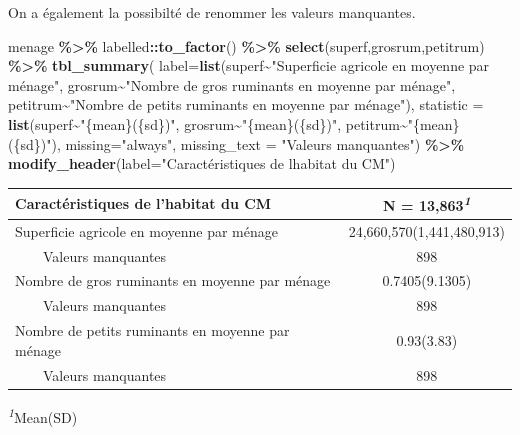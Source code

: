\documentclass[
]{article}
\newenvironment{Shaded}{\begin{snugshade}}{\end{snugshade}}
\newcommand{\AttributeTok}[1]{\textcolor[rgb]{0.13,0.29,0.53}{#1}}
\newcommand{\FunctionTok}[1]{\textcolor[rgb]{0.13,0.29,0.53}{\textbf{#1}}}
\newcommand{\NormalTok}[1]{#1}
\newcommand{\SpecialCharTok}[1]{\textcolor[rgb]{0.81,0.36,0.00}{\textbf{#1}}}
\newcommand{\StringTok}[1]{\textcolor[rgb]{0.31,0.60,0.02}{#1}}
\begin{document}
On a également la possibilté de renommer les valeurs manquantes.

\begin{Shaded}
\begin{Highlighting}[]
\NormalTok{menage }\SpecialCharTok{\%\textgreater{}\%}
\NormalTok{  labelled}\SpecialCharTok{::}\FunctionTok{to\_factor}\NormalTok{() }\SpecialCharTok{\%\textgreater{}\%}
  \FunctionTok{select}\NormalTok{(superf,grosrum,petitrum) }\SpecialCharTok{\%\textgreater{}\%}
  \FunctionTok{tbl\_summary}\NormalTok{(}
    \AttributeTok{label=}\FunctionTok{list}\NormalTok{(superf}\SpecialCharTok{\textasciitilde{}}\StringTok{"Superficie agricole en moyenne par ménage"}\NormalTok{,}
\NormalTok{               grosrum}\SpecialCharTok{\textasciitilde{}}\StringTok{"Nombre de gros ruminants en moyenne par ménage"}\NormalTok{,}
\NormalTok{               petitrum}\SpecialCharTok{\textasciitilde{}}\StringTok{"Nombre de petits ruminants en moyenne par ménage"}\NormalTok{),}
    \AttributeTok{statistic =} \FunctionTok{list}\NormalTok{(superf}\SpecialCharTok{\textasciitilde{}}\StringTok{"\{mean\}(\{sd\})"}\NormalTok{,}
\NormalTok{                     grosrum}\SpecialCharTok{\textasciitilde{}}\StringTok{"\{mean\}(\{sd\})"}\NormalTok{,}
\NormalTok{                     petitrum}\SpecialCharTok{\textasciitilde{}}\StringTok{"\{mean\}(\{sd\})"}\NormalTok{),}
    \AttributeTok{missing=}\StringTok{"always"}\NormalTok{,}
    \AttributeTok{missing\_text =} \StringTok{"Valeurs manquantes"}\NormalTok{) }\SpecialCharTok{\%\textgreater{}\%}
  \FunctionTok{modify\_header}\NormalTok{(}\AttributeTok{label=}\StringTok{"Caractéristiques de l\textquotesingle{}habitat du CM"}\NormalTok{)}
\end{Highlighting}
\end{Shaded}

\begin{table}[!t]
\fontsize{12.0pt}{14.4pt}\selectfont
\begin{tabular*}{\linewidth}{@{\extracolsep{\fill}}lc}
\toprule
Caractéristiques de l'habitat du CM & \textbf{N = 13,863}\textsuperscript{\textit{1}} \\ 
\midrule\addlinespace[2.5pt]
Superficie agricole en moyenne par ménage & 24,660,570(1,441,480,913) \\ 
    Valeurs manquantes & 898 \\ 
Nombre de gros ruminants en moyenne par ménage & 0.7405(9.1305) \\ 
    Valeurs manquantes & 898 \\ 
Nombre de petits ruminants en moyenne par ménage & 0.93(3.83) \\ 
    Valeurs manquantes & 898 \\ 
\bottomrule
\end{tabular*}
\begin{minipage}{\linewidth}
\textsuperscript{\textit{1}}Mean(SD)\\
\end{minipage}
\end{table}
\end{document}
